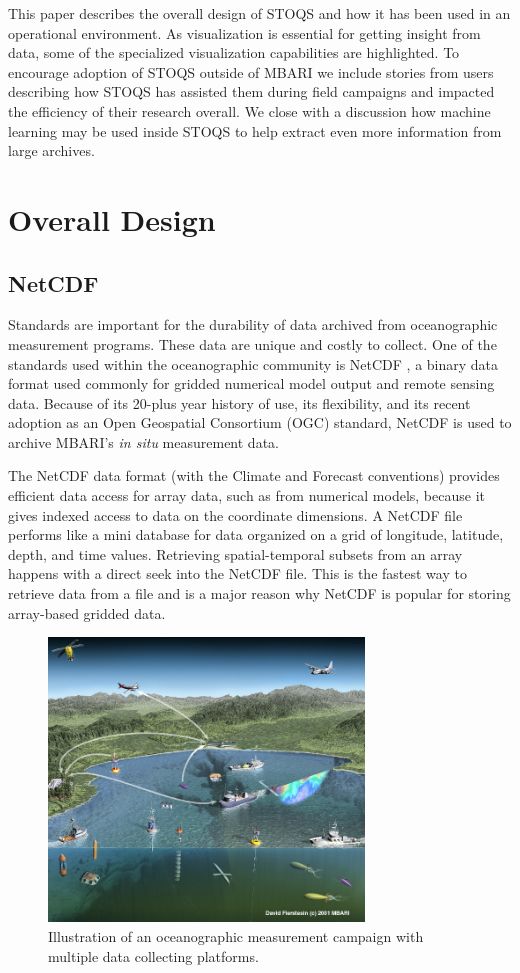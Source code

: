 \documentclass[conference]{IEEEtran}
\begin{document}
This paper describes the overall design of STOQS and how it has been used in an operational environment. As visualization is essential for getting insight from data, some of the specialized visualization capabilities are highlighted. To encourage adoption of STOQS outside of MBARI we include stories from users describing how STOQS has assisted them during field campaigns and impacted the efficiency of their research overall. We close with a discussion how machine learning may be used inside STOQS to help extract even more information from large archives.


\section{Overall Design}

\subsection{NetCDF}

Standards are important for the durability of data archived from oceanographic measurement programs. These data are unique and costly to collect. One of the standards used within the oceanographic community is NetCDF \cite{Rew1990}, a binary data format used commonly for gridded numerical model output and remote sensing data. Because of its 20-plus year history of use, its flexibility, and its recent adoption as an Open Geospatial Consortium (OGC) standard, NetCDF is used to archive MBARI's \textit{in situ} measurement data.

The NetCDF data format (with the Climate and Forecast conventions) provides efficient data access for array data, such as from numerical models, because it gives indexed access to data on the coordinate dimensions. A NetCDF file performs like a mini database for data organized on a grid of longitude, latitude, depth, and time values. Retrieving spatial-temporal subsets from an array happens with a direct seek into the NetCDF file. This is the fastest way to retrieve data from a file and is a major reason why NetCDF is popular for storing array-based gridded data.

\begin{figure}[htbp]
\centering
\includegraphics[width=3.3in]{MUSE_illus_pp.jpg}
\caption{Illustration of an oceanographic measurement campaign with multiple data collecting platforms.}
\label{fig:MUSE_illus_pp}
\end{figure}
\end{document}
